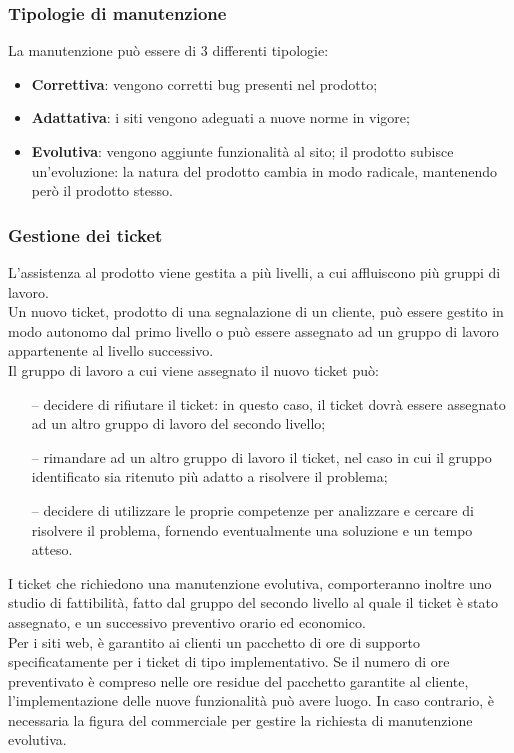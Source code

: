 		\subsubsection{Tipologie di manutenzione}
			La manutenzione può essere di 3 differenti tipologie:
			\begin{itemize}
				\item{\textbf{Correttiva}: vengono corretti bug presenti nel prodotto;}
				\item{\textbf{Adattativa}: i siti vengono adeguati a nuove norme in vigore;}
				\item{\textbf{Evolutiva}: vengono aggiunte funzionalità al sito; il prodotto subisce un'evoluzione: la natura del prodotto cambia in modo radicale, mantenendo però il prodotto stesso.}
			\end{itemize}

		\subsubsection{Gestione dei ticket}
		L'assistenza al prodotto viene gestita a più livelli, a cui affluiscono più gruppi di lavoro. \\
		Un nuovo ticket, prodotto di una segnalazione di un cliente, può essere gestito in modo autonomo dal primo livello o può essere assegnato ad un gruppo di lavoro appartenente al livello successivo. \\
		Il gruppo di lavoro a cui viene assegnato il nuovo ticket può:
		\begin{itemize}
			\item[--] {decidere di rifiutare il ticket: in questo caso, il ticket dovrà essere assegnato ad un altro gruppo di lavoro del secondo livello;}
			\item[--] {rimandare ad un altro gruppo di lavoro il ticket, nel caso in cui il gruppo identificato sia ritenuto più adatto a risolvere il problema;}
			\item[--] {decidere di utilizzare le proprie competenze per analizzare e cercare di risolvere il problema, fornendo eventualmente una soluzione e un tempo atteso.}
		\end{itemize}
	
		I ticket che richiedono una manutenzione evolutiva, comporteranno inoltre uno studio di fattibilità, fatto dal gruppo del secondo livello al quale il ticket è stato assegnato, e un successivo preventivo orario ed economico. \\
		Per i siti web, è garantito ai clienti un pacchetto di ore di supporto specificatamente per i ticket di tipo implementativo. Se il numero di ore preventivato è compreso nelle ore residue del pacchetto garantite al cliente, l'implementazione delle nuove funzionalità può avere luogo. In caso contrario, è necessaria la figura del commerciale per gestire la richiesta di manutenzione evolutiva.

